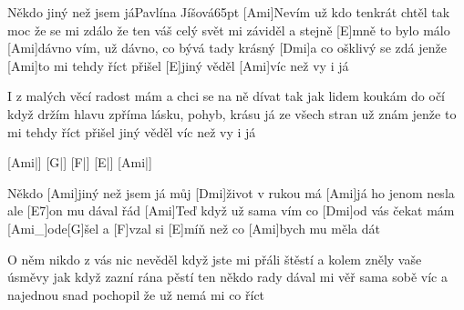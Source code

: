 \begin{song}{Někdo jiný než jsem já}{Pavlína Jíšová}{65pt}
%
[Ami]Nevím už kdo tenkrát chtěl tak moc že se mi zdálo
že ten váš celý svět mi záviděl a stejně [E]mně to bylo málo
[Ami]dávno vím, už dávno, co bývá tady krásný [Dmi]a co ošklivý se zdá
jenže [Ami]to mi tehdy říct přišel [E]jiný věděl [Ami]víc než vy i já
  
% 
I z malých věcí radost mám a chci se na ně dívat
tak jak lidem koukám do očí když držím hlavu zpříma
lásku, pohyb, krásu já ze všech stran už znám
jenže to mi tehdy říct přišel jiný věděl víc než vy i já

[Ami|]{} [G|]{} [F|]{} [E|]{} [Ami|]{}

\chorus%
Někdo [Ami]jiný než jsem já můj [Dmi]{}život v rukou má
[Ami]já ho jenom nesla ale [E7]on mu dával řád
[Ami]Teď když už sama vím co [Dmi]od vás čekat mám
[Ami_]{ode}[G]{šel} a [F]vzal si [E]míň než co [Ami]bych mu měla dát

%
O něm nikdo z vás nic nevěděl když jste mi přáli štěstí
a kolem zněly vaše úsměvy jak když zazní rána pěstí
ten někdo rady dával mi věř sama sobě víc
a najednou snad pochopil že už nemá mi co říct

\chorus
\end{song}
